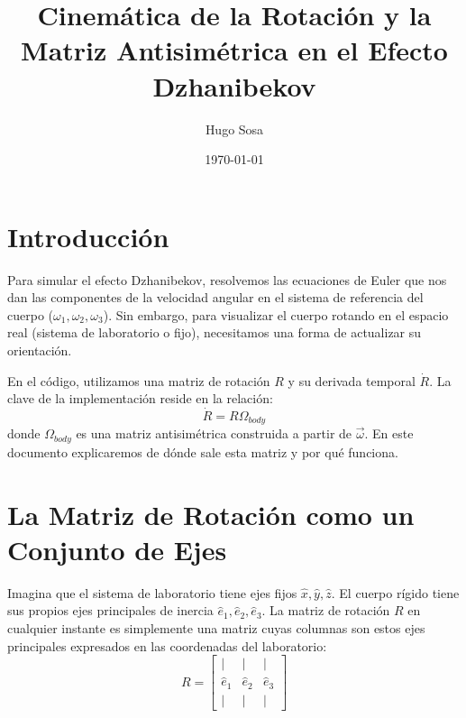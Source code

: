 \documentclass[12pt]{article}
\title{Cinemática de la Rotación y la Matriz Antisimétrica en el Efecto Dzhanibekov}
\author{Hugo Sosa}
\date{\today}
\begin{document}
\maketitle

\section{Introducción}
Para simular el efecto Dzhanibekov, resolvemos las ecuaciones de Euler que nos dan las componentes de la velocidad angular en el sistema de referencia del cuerpo ($\omega_1, \omega_2, \omega_3$). Sin embargo, para visualizar el cuerpo rotando en el espacio real (sistema de laboratorio o fijo), necesitamos una forma de actualizar su orientación.

En el código, utilizamos una matriz de rotación $R$ y su derivada temporal $\dot{R}$. La clave de la implementación reside en la relación:
\begin{equation}
    \dot{R} = R \Omega_{body}
\end{equation}
donde $\Omega_{body}$ es una matriz antisimétrica construida a partir de $\vec{\omega}$. En este documento explicaremos de dónde sale esta matriz y por qué funciona.

\section{La Matriz de Rotación como un Conjunto de Ejes}
Imagina que el sistema de laboratorio tiene ejes fijos $\hat{x}, \hat{y}, \hat{z}$. El cuerpo rígido tiene sus propios ejes principales de inercia $\hat{e}_1, \hat{e}_2, \hat{e}_3$. La matriz de rotación $R$ en cualquier instante es simplemente una matriz cuyas columnas son estos ejes principales expresados en las coordenadas del laboratorio:
\begin{equation}
    R = \begin{bmatrix} | & | & | \\ \hat{e}_1 & \hat{e}_2 & \hat{e}_3 \\ | & | & | \end{bmatrix}
\end{equation}
\end{document}
